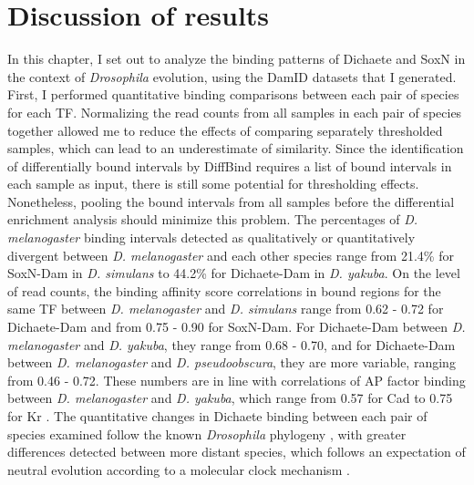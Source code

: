 \section{Discussion of results}
In this chapter, I set out to analyze the binding patterns of Dichaete and SoxN in the context of \emph{Drosophila} evolution, using the DamID datasets that I generated. First, I performed quantitative binding comparisons between each pair of species for each TF. Normalizing the read counts from all samples in each pair of species together allowed me to reduce the effects of comparing separately thresholded samples, which can lead to an underestimate of similarity. Since the identification of differentially bound intervals by DiffBind requires a list of bound intervals in each sample as input, there is still some potential for thresholding effects. Nonetheless, pooling the bound intervals from all samples before the differential enrichment analysis should minimize this problem. The percentages of \emph{D. melanogaster} binding intervals detected as qualitatively or quantitatively divergent between \emph{D. melanogaster} and each other species range from 21.4\% for SoxN-Dam in \emph{D. simulans} to 44.2\% for Dichaete-Dam in \emph{D. yakuba}. On the level of read counts, the binding affinity score correlations in bound regions for the same TF between \emph{D. melanogaster} and \emph{D. simulans} range from 0.62 - 0.72 for Dichaete-Dam and from 0.75 - 0.90 for SoxN-Dam. For Dichaete-Dam between \emph{D. melanogaster} and \emph{D. yakuba}, they range from 0.68 - 0.70, and for Dichaete-Dam between \emph{D. melanogaster} and \emph{D. pseudoobscura}, they are more variable, ranging from 0.46 - 0.72. These numbers are in line with correlations of AP factor binding between \emph{D. melanogaster} and \emph{D. yakuba}, which range from 0.57 for Cad to 0.75 for Kr \citep{bradley_binding_2010}. The quantitative changes in Dichaete binding between each pair of species examined follow the known \emph{Drosophila} phylogeny \citep{russo_molecular_1995}, with greater differences detected between more distant species, which follows an expectation of neutral evolution according to a molecular clock mechanism \citep{he_high_2011}.\\

